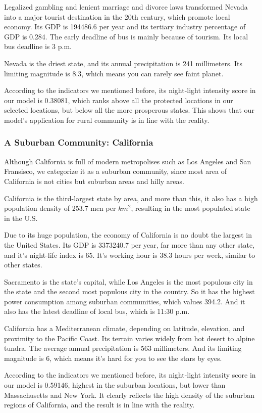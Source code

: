 Legalized gambling and lenient marriage and divorce laws transformed Nevada into a major tourist destination in the 20th century, which promote local economy. Its GDP is 194486.6 per year and its tertiary industry percentage of GDP is 0.284. The early deadline of bus is mainly because of tourism. Its local bus deadline is 3 p.m.

Nevada is the driest state, and its annual precipitation is 241 millimeters. Its limiting magnitude is 8.3, which means you can rarely see faint planet.

According to the indicators we mentioned before, its night-light intensity score in our model is 0.38081, which ranks above all the protected locations in our selected locations, but below all the more prosperous states. This shows that our model's application for rural community is in line with the reality.

\subsubsection{A Suburban Community: California}
Although California is full of modern metropolises such as Los Angeles and San Fransisco, we categorize it as a suburban community, since most area of California is not cities but suburban areas and hilly areas.

California is the third-largest state by area, and more than this, it also has a high population density of 253.7 men per $km^2$, resulting in the most populated state in the U.S.

Due to its huge population, the economy of California is no doubt the largest in the United States. Its GDP is 3373240.7 per year, far more than any other state, and it's night-life index is 65. It's working hour is 38.3 hours per week, similar to other states.

Sacramento is the state's capital, while Los Angeles is the most populous city in the state and the second most populous city in the country. So it has the highest power consumption among suburban communities, which values 394.2. And it also has the latest deadline of local bus, which is 11:30 p.m.

California has a Mediterranean climate, depending on latitude, elevation, and proximity to the Pacific Coast. Its terrain varies widely from hot desert to alpine tundra. The average annual precipitation is 563 millimeters. And its limiting magnitude is 6, which means it's hard for you to see the stars by eyes.

According to the indicators we mentioned before, its night-light intensity score in our model is 0.59146, highest in the suburban locations, but lower than Massachusetts and New York. It clearly reflects the high density of the suburban regions of California, and the result is in line with the reality.

